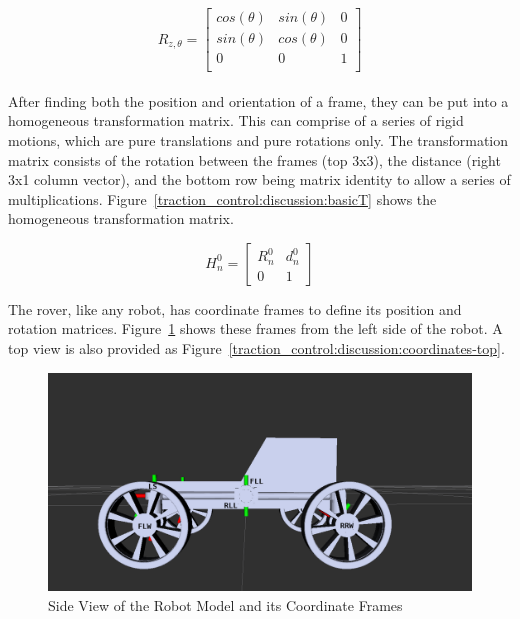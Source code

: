 \begin{equation}
	R_{z,\theta} = \left[\begin{array}{ccc}
		cos(\theta) & sin(\theta) & 0 \\
		sin(\theta) & cos(\theta) & 0 \\
		0 & 0 & 1 \\
	 
	\end{array}\right]
	\label{traction_control:discussion:rz}
\end{equation}\\

After finding both the position and orientation of a frame, they can be put into a homogeneous transformation matrix. This can comprise of a series of rigid motions, which are pure translations and pure rotations only. The transformation matrix consists of the rotation between the frames (top 3x3), the distance (right 3x1 column vector), and the bottom row being matrix identity to allow a series of multiplications. Figure~\ref{traction_control:discussion:basicT} shows the homogeneous transformation matrix. 

\begin{equation}
	H^{0}_{n} = \left[\begin{array}{cc}
			R^{0}_{n} & d^{0}_{n}\\
			0 & 1 
			\end{array}\right]
		\label{traction_control:discussion:basicT}
\end{equation}


The rover, like any robot, has coordinate frames to define its position and rotation matrices.
 Figure~\ref{traction_control:discussion:coordinates-side} shows these frames from the left side of the robot. A top view is also provided as Figure~\ref{traction_control:discussion:coordinates-top}.

\begin{figure}[H]
	\centering
	\includegraphics[scale=0.35, width=.7\textwidth]{sections/discussion/images/srr_side.png}
	\caption{Side View of the Robot Model and its Coordinate Frames}
	\label{traction_control:discussion:coordinates-side}
\end{figure}
 
